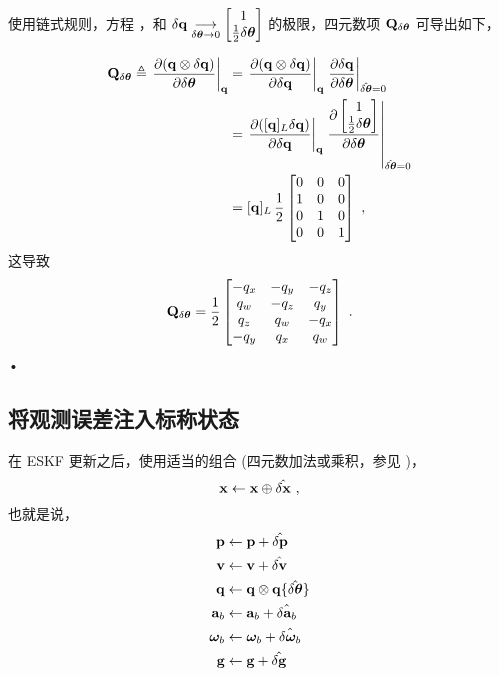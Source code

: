 使用链式规则，方程 ，和 $\delta{\bf q} \underset{\delta{\bm \theta}\to 0}{\longrightarrow} \begin{bmatrix}
1 \\ \frac12\delta{\bm \theta}
\end{bmatrix}$ 的极限，四元数项 ${\bf Q}_{\delta{\bm \theta}}$ 可导出如下，
%
{
\setlength{\arraycolsep}{2pt}
\begin{align*}
{\bf Q}_{\delta{\bm \theta}} \triangleq \left.\frac{\partial({\bf q}\otimes\delta{\bf q})}{\partial\delta{\bm \theta}}\right|_{{\bf q}} 
&=\left.\frac{\partial({\bf q}\otimes\delta{\bf q})}{\partial\delta{\bf q}}\right|_{{\bf q}} \left.\frac{\partial\delta{\bf q}}{\partial\delta{\bm \theta}}\right|_{\hat{\delta{\bm \theta}}=0} \\
&= \left.\frac{\partial([{\bf q}]_L\delta{\bf q})}{\partial\delta{\bf q}}\right|_{{\bf q}} \left.\frac{\partial\begin{bmatrix}
1 \\ \frac12\delta{\bm \theta}
\end{bmatrix}}{\partial\delta{\bm \theta}}\right|_{\hat{\delta{\bm \theta}}=0} \\
&= [{\bf q}]_L\,\frac12\begin{bmatrix}
0 & 0 & 0 \\
1 & 0 & 0 \\
0 & 1 & 0 \\
0 & 0 & 1 \\
\end{bmatrix} ~,
\end{align*}
%
这导致
%
\begin{equation}
{\bf Q}_{\delta{\bm \theta}}
= \frac{1}{2}\begin{bmatrix}
-q_x &-q_y &-q_z\\
 q_w &-q_z & q_y\\
 q_z & q_w &-q_x\\
-q_y & q_x & q_w\\
\end{bmatrix}~.
\end{equation}•

\subsection{将观测误差注入标称状态}

在 ESKF 更新之后，使用适当的组合 (四元数加法或乘积，参见 )，
%
\begin{equation}
{\bf x} \gets {\bf x} \oplus \hat{\delta{\bf x}}~, \label{equ:errorInjection}
\end{equation}
%
也就是说，
%
\begin{subequations}
%
\begin{align}
{\bf p} &\gets {\bf p} + \hat{\delta{\bf p}} \\
{\bf v} &\gets {\bf v} + \hat{\delta{\bf v}} \\
{\bf q} &\gets {\bf q} \otimes {\bf q}\{\hat{\delta{\bm \theta}}\} \label{equ:quatErrorInjection}\\
{\bf a}_b &\gets {\bf a}_b + \hat{\delta{\bf a}_b} \\
{\bm \omega}_b &\gets {\bm \omega}_b + \hat{\delta{\bm \omega}_b} \\
{\bf g} &\gets {\bf g} + \hat{\delta{\bf g}} 
\end{align}%
\end{subequations}%

}
